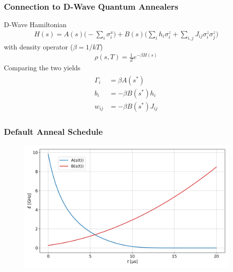 \documentclass{beamer}
\begin{document}
\begin{frame}
    \frametitle{Connection to D-Wave Quantum Annealers}
    D-Wave Hamiltonian~\cite{dwave_qa}
    \begin{align}
        H(s) = A(s) \bigg( -\sum_i \sigma_i^x \bigg) + B(s) \bigg( \sum_i h_i \sigma_i^z + \sum_{i,j} J_{ij} \sigma_i^z \sigma_j^z \bigg)
    \end{align}
    with density operator (\( \beta = 1 / k T \))
    \begin{align}
        \rho(s, T) = \frac{1}{Z} e^{-\beta H(s)}
    \end{align}
    Comparing the two yields
    \begin{align}
    \begin{split}
        \Gamma_i
            &= \beta A(s^*) \\
        b_i
            &= -\beta B(s^*) h_i \\
        w_{ij}
            &= -\beta B(s^*) J_{ij}
        \label{eq:qbm_scaling}
    \end{split}
    \end{align}
\end{frame}

\begin{frame}
    \frametitle{Default Anneal Schedule}
    \begin{figure}
        \includegraphics[width=1\linewidth]{qbm/anneal_schedules/Advantage_system4.1-s_pause=1.00-pause_duration=0.png}
    \end{figure}
\end{frame}
\end{document}
